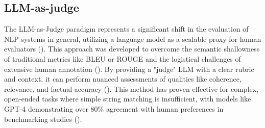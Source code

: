         \subsection{LLM-as-judge}
            





            The LLM-as-Judge paradigm represents a significant shift in the evaluation of NLP systems in general, utilizing a language model as a scalable proxy for human evaluators (\cite{li2024llmsasjudgescomprehensivesurveyllmbased}). This approach was developed to overcome the semantic shallowness of traditional metrics like BLEU or ROUGE and the logistical challenges of extensive human annotation (\cite{Zheng2023}). By providing a "judge" LLM with a clear rubric and context, it can perform nuanced assessments of qualities like coherence, relevance, and factual accuracy (\cite{li2024llmsasjudgescomprehensivesurveyllmbased}). This method has proven effective for complex, open-ended tasks where simple string matching is insufficient, with models like GPT-4 demonstrating over 80\% agreement with human preferences in benchmarking studies (\cite{Zheng2023}).

